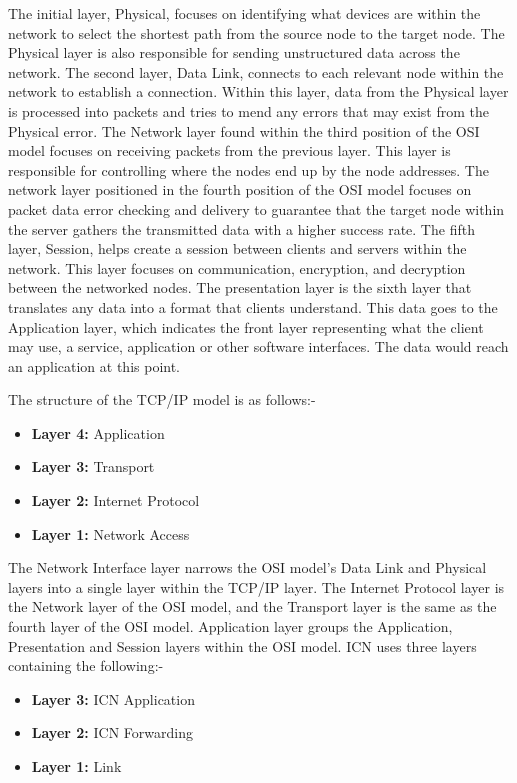 \documentclass[conference]{IEEEtran}
\begin{document}
      The initial layer, Physical, focuses on identifying what devices are within the network to select the shortest path from the source node to the target node. The Physical layer is also responsible for sending unstructured data across the network. The second layer, Data Link, connects to each relevant node within the network to establish a connection. Within this layer, data from the Physical layer is processed into packets and tries to mend any errors that may exist from the Physical error. The Network layer found within the third position of the OSI model focuses on receiving packets from the previous layer. This layer is responsible for controlling where the nodes end up by the node addresses. The network layer positioned in the fourth position of the OSI model focuses on packet data error checking and delivery to guarantee that the target node within the server gathers the transmitted data with a higher success rate. The fifth layer, Session, helps create a session between clients and servers within the network. This layer focuses on communication, encryption, and decryption between the networked nodes. The presentation layer is the sixth layer that translates any data into a format that clients understand. This data goes to the Application layer, which indicates the front layer representing what the client may use, a service, application or other software interfaces. The data would reach an application at this point.

      The structure of the TCP/IP model is as follows:-
      \begin{itemize}
        \item[] \textbf{Layer 4:} Application
        \item[] \textbf{Layer 3:} Transport
        \item[] \textbf{Layer 2:} Internet Protocol
        \item[] \textbf{Layer 1:} Network Access
      \end{itemize}

      The Network Interface layer narrows the OSI model's Data Link and Physical layers into a single layer within the TCP/IP layer. The Internet Protocol layer is the Network layer of the OSI model, and the Transport layer is the same as the fourth layer of the OSI model. Application layer groups the Application, Presentation and Session layers within the OSI model.
      ICN uses three layers containing the following:-

      \begin{itemize}
        \item[] \textbf{Layer 3:} ICN Application
        \item[] \textbf{Layer 2:} ICN Forwarding
        \item[] \textbf{Layer 1:} Link
      \end{itemize}
\end{document}

